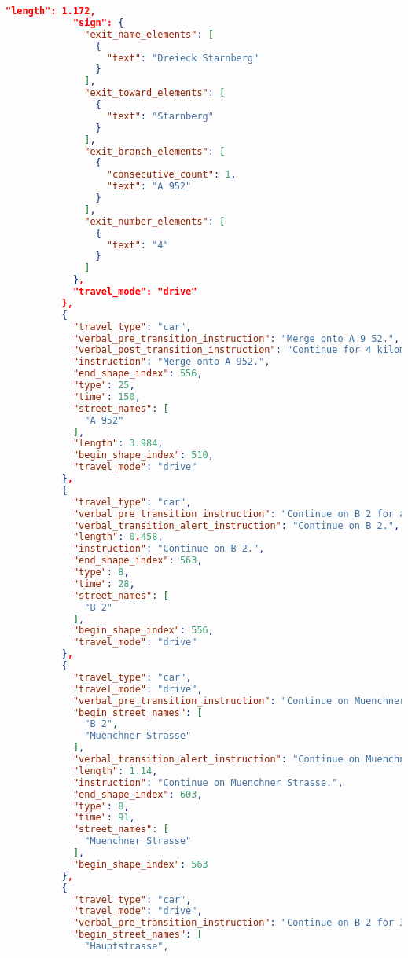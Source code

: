 \begin{lstlisting}[language=json,breaklines=true]
            "length": 1.172,
            "sign": {
              "exit_name_elements": [
                {
                  "text": "Dreieck Starnberg"
                }
              ],
              "exit_toward_elements": [
                {
                  "text": "Starnberg"
                }
              ],
              "exit_branch_elements": [
                {
                  "consecutive_count": 1,
                  "text": "A 952"
                }
              ],
              "exit_number_elements": [
                {
                  "text": "4"
                }
              ]
            },
            "travel_mode": "drive"
          },
          {
            "travel_type": "car",
            "verbal_pre_transition_instruction": "Merge onto A 9 52.",
            "verbal_post_transition_instruction": "Continue for 4 kilometers.",
            "instruction": "Merge onto A 952.",
            "end_shape_index": 556,
            "type": 25,
            "time": 150,
            "street_names": [
              "A 952"
            ],
            "length": 3.984,
            "begin_shape_index": 510,
            "travel_mode": "drive"
          },
          {
            "travel_type": "car",
            "verbal_pre_transition_instruction": "Continue on B 2 for a half kilometer.",
            "verbal_transition_alert_instruction": "Continue on B 2.",
            "length": 0.458,
            "instruction": "Continue on B 2.",
            "end_shape_index": 563,
            "type": 8,
            "time": 28,
            "street_names": [
              "B 2"
            ],
            "begin_shape_index": 556,
            "travel_mode": "drive"
          },
          {
            "travel_type": "car",
            "travel_mode": "drive",
            "verbal_pre_transition_instruction": "Continue on Muenchner Strasse for 1.1 kilometers.",
            "begin_street_names": [
              "B 2",
              "Muenchner Strasse"
            ],
            "verbal_transition_alert_instruction": "Continue on Muenchner Strasse.",
            "length": 1.14,
            "instruction": "Continue on Muenchner Strasse.",
            "end_shape_index": 603,
            "type": 8,
            "time": 91,
            "street_names": [
              "Muenchner Strasse"
            ],
            "begin_shape_index": 563
          },
          {
            "travel_type": "car",
            "travel_mode": "drive",
            "verbal_pre_transition_instruction": "Continue on B 2 for 3.1 kilometers.",
            "begin_street_names": [
              "Hauptstrasse",

\end{lstlisting}
